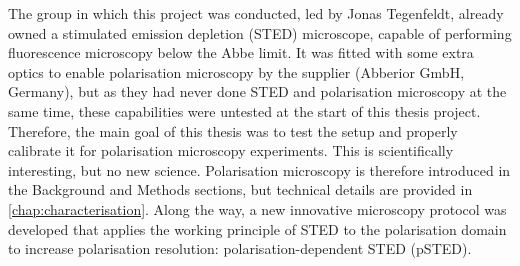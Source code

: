 The group in which this project was conducted, led by Jonas Tegenfeldt, already owned a stimulated emission depletion (STED) microscope, capable of performing fluorescence microscopy below the Abbe limit. It was fitted with some extra optics to enable polarisation microscopy by the supplier (Abberior GmbH, Germany), but as they had never done STED and polarisation microscopy at the same time, these capabilities were untested at the start of this thesis project. Therefore, the main goal of this thesis was to test the setup and properly calibrate it for polarisation microscopy experiments. This is scientifically interesting, but no new science. Polarisation microscopy is therefore introduced in the Background and Methods sections, but technical details are provided in \autoref{chap:characterisation}. Along the way, a new innovative microscopy protocol was developed that applies the working principle of STED to the polarisation domain to increase polarisation resolution: polarisation-dependent STED (pSTED).